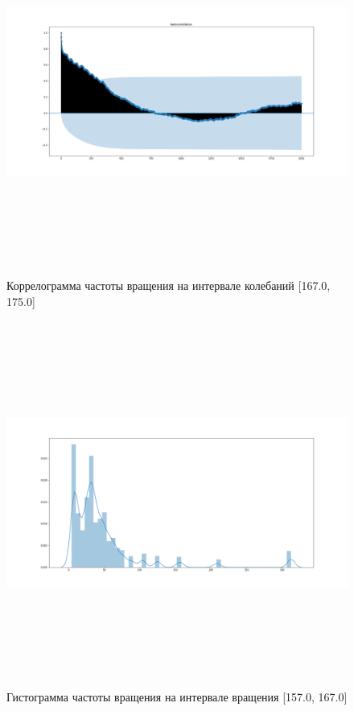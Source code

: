 \documentclass[a4paper,12pt]{article} %
\begin{document}
	\begin{figure}[H]
		\includegraphics[width = 18cm, height = 12cm]{autocor_fluct_droped.png}
		\caption{Коррелограмма частоты вращения  на интервале колебаний [167.0, 175.0]}
		\label{fig:autocor_fluct_droped}
	\end{figure}

	\begin{figure}[H]		
		\includegraphics[width = 18cm, height = 12cm]{rot_droped_hist.png}
		\caption{Гистограмма частоты вращения на интервале вращения [157.0, 167.0]}
		\label{fig:rot_droped_hist}
	\end{figure}
\end{document}
